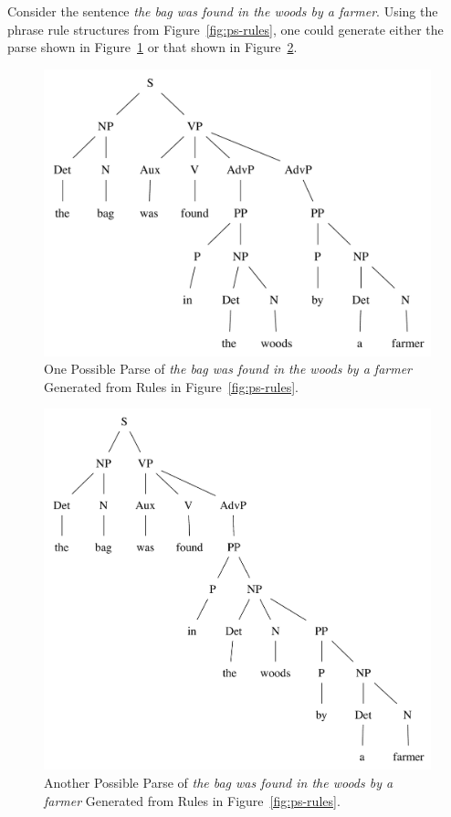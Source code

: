 \documentclass[main.tex]{subfiles}
\begin{document}
Consider the sentence \textit{the bag was found in the woods by a farmer}. Using the phrase rule structures from Figure~\ref{fig:ps-rules}, one could generate either the parse shown in Figure~\ref{fig:ps-tree-ambig1} or that shown in Figure~\ref{fig:ps-tree-ambig2}. 
\begin{figure}[htbp]
\centering
\includegraphics[scale=0.6]{ps-tree-ambig1.pdf}
\caption{One Possible Parse of \textit{the bag was found in the woods by a farmer} Generated from Rules in Figure~\ref{fig:ps-rules}.}
\label{fig:ps-tree-ambig1}
\end{figure}
\begin{figure}[htbp]
\centering
\includegraphics[scale=0.6]{ps-tree-ambig2.pdf}
\caption{Another Possible Parse of \textit{the bag was found in the woods by a farmer} Generated from Rules in Figure~\ref{fig:ps-rules}.}
\label{fig:ps-tree-ambig2}
\end{figure}
\end{document}
